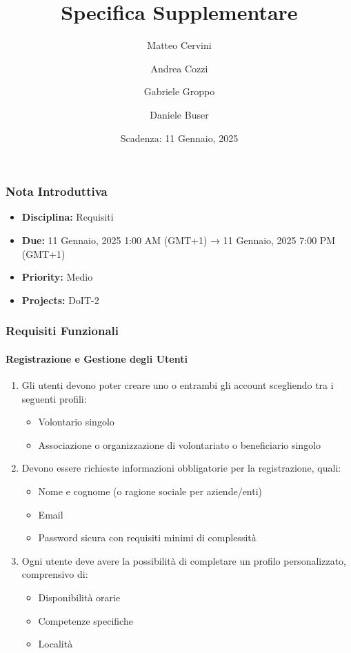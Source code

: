 \title{Specifica Supplementare}
\author{Matteo Cervini \and Andrea Cozzi \and Gabriele Groppo \and Daniele Buser}
\date{Scadenza: 11 Gennaio, 2025}

\maketitle

\subsubsection{Nota Introduttiva}
\begin{itemize}
\item \textbf{Disciplina:} Requisiti
\item \textbf{Due:} 11 Gennaio, 2025 1:00 AM (GMT+1) → 11 Gennaio, 2025 7:00 PM (GMT+1)
\item \textbf{Priority:} Medio
\item \textbf{Projects:} DoIT-2

\end{itemize}
\subsubsection{Requisiti Funzionali}

\paragraph{Registrazione e Gestione degli Utenti}

\begin{enumerate}
    \item Gli utenti devono poter creare uno o entrambi gli account scegliendo tra i seguenti profili:
    \begin{itemize}
        \item Volontario singolo
        \item Associazione o organizzazione di volontariato o beneficiario singolo
    \end{itemize}
    
    \item Devono essere richieste informazioni obbligatorie per la registrazione, quali:
    \begin{itemize}
        \item Nome e cognome (o ragione sociale per aziende/enti)
        \item Email
        \item Password sicura con requisiti minimi di complessità
    \end{itemize}
    
    \item Ogni utente deve avere la possibilità di completare un profilo personalizzato, comprensivo di:
    \begin{itemize}
        \item Disponibilità orarie
        \item Competenze specifiche
        \item Località
    \end{itemize}
\end{enumerate}

